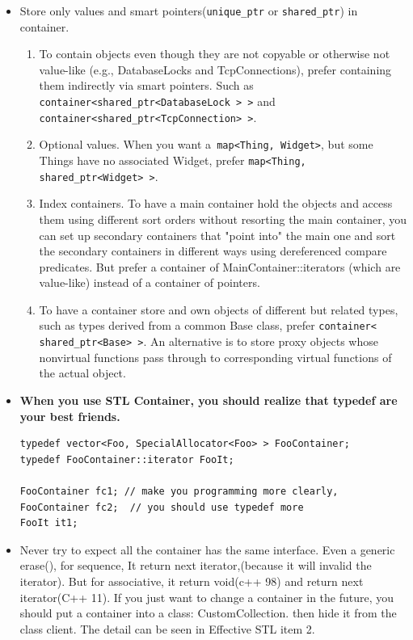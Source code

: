 \documentclass[a4paper,11pt,twoside]{book}
\begin{document}
\begin{itemize}
		
	\item Store only values and smart pointers(\texttt{unique\_ptr} or \texttt{shared\_ptr}) in container.

\begin{enumerate}
	\item To contain objects even though they are not copyable or otherwise not value-like (e.g., DatabaseLocks and
	TcpConnections), prefer containing them indirectly via smart pointers. Such as
	\texttt{container<shared\_ptr<DatabaseLock > >} and \\
	\texttt{container<shared\_ptr<TcpConnection> >}.
	
	\item Optional values. When you want a\texttt{ map<Thing, Widget>}, but some Things have no associated Widget, prefer \texttt{map<Thing, shared\_ptr<Widget> >}.
	
	\item Index containers. To have a main container hold the objects and access them using different sort orders without resorting the main container, you can set up secondary containers that "point into" the main one and sort the secondary containers in different ways using dereferenced compare predicates. But prefer a container of MainContainer::iterators (which are value-like) instead of a container of pointers.
	
	\item To have a container store and own objects of different but related types, such as types derived from a common Base class, prefer \texttt{container< shared\_ptr<Base> >}. An alternative is to store proxy objects whose nonvirtual functions pass through to corresponding virtual functions of the actual object.
\end{enumerate}



\item \textbf{When you use STL Container, you should realize that typedef are your best friends.}
\begin{lstlisting}[numbers=none]
typedef vector<Foo, SpecialAllocator<Foo> > FooContainer;
typedef FooContainer::iterator FooIt;

FooContainer fc1; // make you programming more clearly,
FooContainer fc2;  // you should use typedef more
FooIt it1;
\end{lstlisting}

\item Never try to expect all the container has the same interface. Even a generic erase(), for sequence, It return next iterator,(because it will invalid the iterator).   But for associative, it return void(c++ 98) and return next iterator(C++ 11). If you just want to change a container in the future, you should put a container into a class: CustomCollection. then hide it from the class client. The detail can be seen in Effective STL item 2.


\end{itemize}
\end{document}
